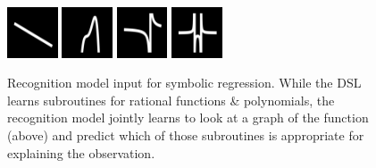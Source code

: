 \documentclass{article}
\newcommand{\probability}{\mathds{P}} %
\begin{document}
\begin{figure} \newcommand{\functionSize}{1.5cm}\vspace{-0.5cm}\centering
  \includegraphics[width = \functionSize]{figures/functions/6.png}
  \includegraphics[width = \functionSize]{figures/functions/116.png}
  \includegraphics[width = \functionSize]{figures/functions/160.png}
  \includegraphics[width = \functionSize]{figures/functions/149.png}
  \caption{Recognition model input for symbolic regression. While the DSL learns subroutines for rational functions \& polynomials, the recognition  model jointly learns to look at a graph of the function (above) and predict which of those subroutines is appropriate for explaining the observation.}\label{functions}
\end{figure}
\end{document}
